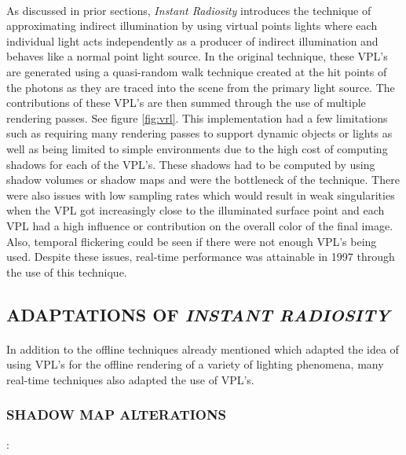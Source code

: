 \paragraph{}
As discussed in prior sections, \textit{Instant Radiosity} introduces the technique of approximating indirect illumination by using virtual points lights where each individual light acts independently as a producer of indirect illumination and behaves like a normal point light source.  In the original technique, these VPL's are generated using a quasi-random walk technique created at the hit points of the photons as they are traced into the scene from the primary light source.  The contributions of these VPL's are then summed through the use of multiple rendering passes.  See figure \ref{fig:vrl}. This implementation had a few limitations such as requiring many rendering passes to support dynamic objects or lights as well as being limited to simple environments due to the high cost of computing shadows for each of the VPL's.  These shadows had to be computed by using shadow volumes or shadow maps and were the bottleneck of the technique.  There were also issues with low sampling rates which would result in weak singularities when the VPL got increasingly close to the illuminated surface point and each VPL had a high influence or contribution on the overall color of the final image.  Also, temporal flickering could be seen if there were not enough VPL's being used.  Despite these issues, real-time performance was attainable in 1997 through the use of this technique.

\subsection{ADAPTATIONS OF \textit{INSTANT RADIOSITY}}
\paragraph{}
In addition to the offline techniques already mentioned which adapted the idea of using VPL's for the offline rendering of a variety of lighting phenomena, many real-time techniques also adapted the use of VPL's.

\subsubsection{SHADOW MAP ALTERATIONS}: 
